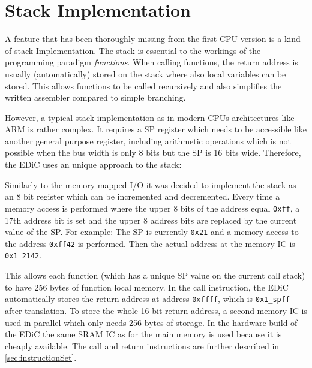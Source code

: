 \section{Stack Implementation}
A feature that has been thoroughly missing from the first \gls{CPU} version is a kind of stack Implementation.
The stack is essential to the workings of the programming paradigm \emph{functions}.
When calling functions, the return address is usually (automatically) stored on the stack where also local variables can be stored.
This allows functions to be called recursively and also simplifies the written assembler compared to simple branching.

However, a typical stack implementation as in modern \glspl{CPU} architectures like ARM is rather complex.
It requires a \gls{SP} register which needs to be accessible like another general purpose register, including arithmetic operations which is not possible when the bus width is only 8 bits but the \gls{SP} is 16 bits wide.
Therefore, the \gls{EDiC} uses an unique approach to the stack:

Similarly to the memory mapped I/O it was decided to implement the stack as an 8 bit register which can be incremented and decremented.
Every time a memory access is performed where the upper 8 bits of the address equal \texttt{0xff}, a 17th address bit is set and the upper 8 address bits are replaced by the current value of the \gls{SP}.
For example: The \gls{SP}  is currently \texttt{0x21} and a memory access to the address \texttt{0xff42} is performed.
Then the actual address at the memory \gls{IC} is \texttt{0x1\_2142}.

This allows each function (which has a unique \gls{SP} value on the current call stack) to have 256 bytes of function local memory.
In the call instruction, the \gls{EDiC} automatically stores the return address at address \texttt{0xffff}, which is \texttt{0x1\_spff} after translation.
To store the whole 16 bit return address, a second memory \gls{IC} is used in parallel which only needs 256 bytes of storage.
In the hardware build of the \gls{EDiC} the same \gls{SRAM} \gls{IC} as for the main memory is used because it is cheaply available.
The call and return instructions are further described in \cref{sec:instructionSet}.
